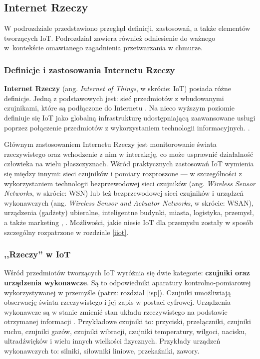 \documentclass[a4paper, 12pt, twoside]{article}
\begin{document}
\subsection{Internet Rzeczy}\label{iot}

W podrozdziale przedstawiono przegląd definicji, zastosowań, a także
elementów tworzących IoT. Podrozdział zawiera również odniesienie do ważnego
w~kontekście omawianego zagadnienia przetwarzania w chmurze.

\subsubsection{Definicje i zastosowania Internetu Rzeczy}

\textbf{Internet Rzeczy} (ang. \emph{Internet of Things}, w skrócie: IoT) posiada różne definicje.
Jedną z podstawowych jest: sieć przedmiotów z wbudowanymi czujnikami, które są podłączone
do Internetu \cite{intro-to-iot}. Na nieco wyższym poziomie definiuje się IoT jako globalną infrastrukturę udostępniającą
zaawansowane usługi poprzez połączenie przedmiotów z wykorzystaniem technologii informacyjnych.
\cite{intro-to-iot}.

Głównym zastosowaniem Internetu Rzeczy jest monitorowanie świata rzeczywistego
oraz wchodzenie z nim w interakcję, co może usprawnić działalność człowieka na wielu płaszczyznach.
Wśród praktycznych zastosowań IoT wymienia się między innymi:
sieci czujników i pomiary rozproszone --- w szczególności z wykorzystaniem
technologii bezprzewodowej sieci czujników
(ang. \emph{Wireless Sensor Networks}, w skrócie: WSN) lub też
bezprzewodowej sieci czujników i urządzeń wykonawczych
(ang. \emph{Wireless Sensor and Actuator Networks}, w skrócie: WSAN), urządzenia (gadżety) ubieralne,
inteligentne budynki, miasta, logistyka, przemysł, a także marketing \cite{internet-reczy},
\cite{wsan}.
Możliwości, jakie niesie IoT dla przemysłu zostały w sposób szczególny rozpatrzone
w rozdziale \ref{iiot}.

\subsubsection{,,Rzeczy'' w IoT}

Wśród przedmiotów tworzących IoT wyróżnia się dwie kategorie:
\textbf{czujniki oraz urządzenia wykonawcze}. Są to odpowiedniki aparatury kontrolno-pomiarowej
wykorzystywanej w przemyśle (patrz: rozdział \ref{isp}). Czujniki umożliwiają
obserwację świata rzeczywistego i jej zapis w postaci cyfrowej.
Urządzenia wykonawcze są w stanie zmienić stan układu rzeczywistego
na podstawie otrzymanej informacji \cite{iot-hype-to-reality}.
Przykładowe czujniki to: przyciski, przełączniki, czujniki ruchu, czujniki gazów,
czujniki wibracji, czujniki temperatury, wilgoci,
nacisku, ultradźwięków i wielu innych wielkości fizycznych. Przykłady urządzeń
wykonawczych to: silniki, siłowniki liniowe, przekaźniki, zawory.
\end{document}
